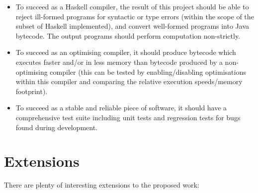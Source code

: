 \documentclass[12pt]{article}
\begin{document}
\begin{itemize}
\item
{
    To succeed as a Haskell compiler, the result of this project should be able to reject ill-formed programs for
    syntactic or type errors (within the scope of the subset of Haskell implemented), and convert well-formed programs
    into Java bytecode. The output programs should perform computation non-strictly.
}
\item
{
    To succeed as an optimising compiler, it should produce bytecode which executes faster and/or in less memory than
    bytecode produced by a non-optimising compiler (this can be tested by enabling/disabling optimisations within this
    compiler and comparing the relative execution speeds/memory footprint).
}
\item
{
    To succeed as a stable and reliable piece of software, it should have a comprehensive test suite including unit
    tests and regression tests for bugs found during development.
}
\end{itemize}


\section*{Extensions}

There are plenty of interesting extensions to the proposed work:
\end{document}
